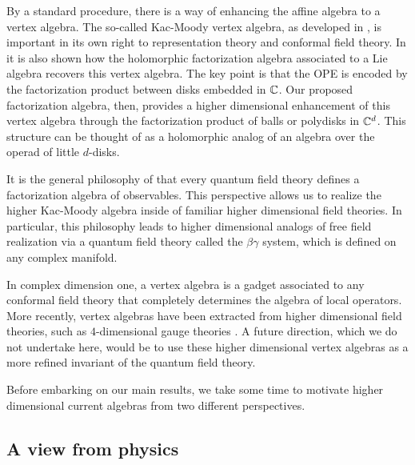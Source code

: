 By a standard procedure, there is a way of enhancing the affine algebra to a vertex algebra. 
The so-called Kac-Moody vertex algebra, as developed in \cite{IgorKM, KacVertex, BorcherdsVertex}, is important in its own right to representation theory and conformal field theory. 
In \cite{CG1} it is also shown how the holomorphic factorization algebra associated to a Lie algebra recovers this vertex algebra. 
The key point is that the OPE is encoded by the factorization product between disks embedded in $\mathbb C$. 
Our proposed factorization algebra, then, provides a higher dimensional enhancement of this vertex algebra through the factorization product of balls or polydisks in $\mathbb C^d$. 
This structure can be thought of as a holomorphic analog of an algebra over the operad of little $d$-disks.

It is the general philosophy of \cite{CG1,CG2} that every quantum field theory defines a factorization algebra of observables.
This perspective allows us to realize the higher Kac-Moody algebra inside of familiar higher dimensional field theories. 
In particular, this philosophy leads to higher dimensional analogs of free field realization via a quantum field theory called the $\beta\gamma$ system, which is defined on any complex manifold. 

In complex dimension one, a vertex algebra is a gadget associated to any conformal field theory that completely determines the algebra of local operators.  
More recently, vertex algebras have been extracted from higher dimensional field theories, such as $4$-dimensional gauge theories \cite{Beem1,Beem2}. 
A future direction, which we do not undertake here, would be to use these higher dimensional vertex algebras as a more refined invariant of the quantum field theory. 

Before embarking on our main results, we take some time to motivate higher dimensional current algebras from two different perspectives. 


\subsection*{A view from physics}


